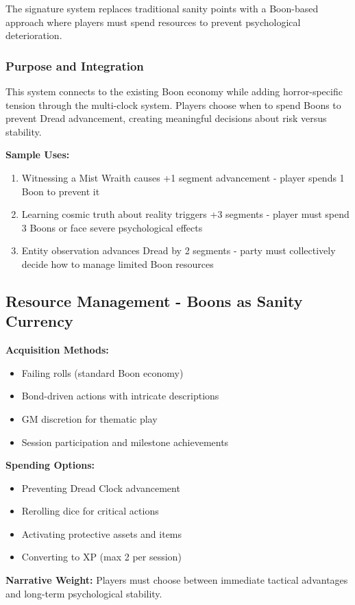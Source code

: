 \documentclass[11pt]{article}
\newenvironment{mechanic}[1]{%
  \begin{mdframed}[backgroundcolor=tableheader, linewidth=1pt, linecolor=accentcolor]%
  \subsubsection*{#1}%
}{%
  \end{mdframed}%
}
\begin{document}
The signature system replaces traditional sanity points with a Boon-based approach where players must spend resources to prevent psychological deterioration.

\begin{mechanic}{Purpose and Integration}
This system connects to the existing Boon economy while adding horror-specific tension through the multi-clock system. Players choose when to spend Boons to prevent Dread advancement, creating meaningful decisions about risk versus stability.
\end{mechanic}

\textbf{Sample Uses:}
\begin{enumerate}
\item Witnessing a Mist Wraith causes +1 segment advancement - player spends 1 Boon to prevent it
\item Learning cosmic truth about reality triggers +3 segments - player must spend 3 Boons or face severe psychological effects
\item Entity observation advances Dread by 2 segments - party must collectively decide how to manage limited Boon resources
\end{enumerate}

\subsection{Resource Management - Boons as Sanity Currency}

\textbf{Acquisition Methods:}
\begin{itemize}
\item Failing rolls (standard Boon economy)
\item Bond-driven actions with intricate descriptions
\item GM discretion for thematic play
\item Session participation and milestone achievements
\end{itemize}

\textbf{Spending Options:}
\begin{itemize}
\item Preventing Dread Clock advancement
\item Rerolling dice for critical actions
\item Activating protective assets and items
\item Converting to XP (max 2 per session)
\end{itemize}

\textbf{Narrative Weight:} Players must choose between immediate tactical advantages and long-term psychological stability.
\end{document}
